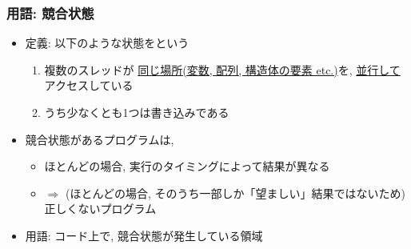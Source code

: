 \documentclass[12pt,dvipdfmx]{beamer}
\begin{document}

\begin{frame}
  \frametitle{用語: 競合状態}
  \begin{itemize}
  \item [] 定義: 以下のような状態をという
    \begin{enumerate}
    \item 複数のスレッドが
      \underline{同じ場所(変数, 配列, 構造体の要素 etc.)}を, 
      \underline{並行して}
      アクセスしている
    \item うち少なくとも1つは書き込みである
    \end{enumerate}
  \item 競合状態があるプログラムは, 
    \begin{itemize}
    \item ほとんどの場合,  実行のタイミングによって結果が異なる
    \item $\Rightarrow$ 
      (ほとんどの場合, そのうち一部しか「望ましい」結果ではないため)
      正しくないプログラム
    \end{itemize}
  \item 用語: 
    コード上で, 競合状態が発生している領域
  \end{itemize}
\end{frame}
\end{document}
